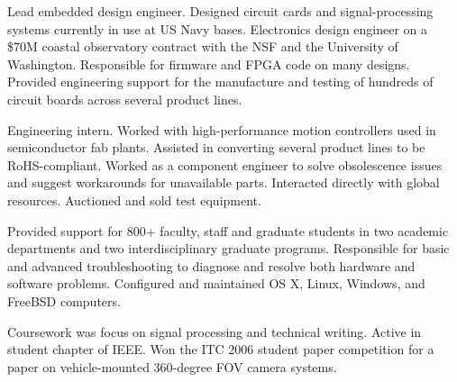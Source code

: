\documentclass[letterpaper, 10pt]{article}
\begin{document}
\begin{spacing}{0.5}
\begin{minipage}[t]{0.4\textwidth}
\par
{}
\par \smallskip \smallskip
Lead embedded design engineer. Designed circuit cards and signal-processing systems currently in use at US Navy bases. Electronics design engineer on a \$70M coastal observatory contract with the NSF and the University of Washington. Responsible for firmware and FPGA code on many designs. Provided engineering support for the manufacture and testing of hundreds of circuit boards across several product lines.
\par\bigskip
%
\par \smallskip \smallskip
Engineering intern. Worked with high-performance motion controllers used in semiconductor fab plants. Assisted in converting several product lines to be RoHS-compliant. Worked as a component engineer to solve obsolescence issues and suggest workarounds for unavailable parts. Interacted
directly with global resources. Auctioned and sold test equipment.
\par\bigskip
%
\par \smallskip \smallskip
Provided support for 800+ faculty, staff and graduate students in two academic departments and two interdisciplinary graduate programs. Responsible for basic and advanced troubleshooting to diagnose and resolve both hardware and software problems. Configured and maintained OS X, Linux, Windows, and FreeBSD computers.
\par\bigskip
%
\par
{}
\par \smallskip \smallskip
Coursework was focus on signal processing and technical writing. Active in student chapter of IEEE. 
Won the ITC 2006 student paper competition for a paper on vehicle-mounted 360-degree FOV camera systems.
\par\bigskip
%
\par
{}
\par \smallskip \smallskip
{}

\end{minipage} \end{spacing}
\end{document}
